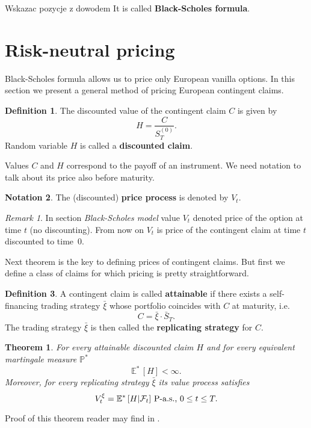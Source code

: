 \documentclass[a4paper,12pt, oneside]{book}
\newtheorem{thm}{Theorem}[section]
\theoremstyle{definition}
\newtheorem{mydef}{Definition}[section]
\newtheorem{notation}[mydef]{Notation}
\theoremstyle{remark}
\newtheorem{remark}{Remark}
\def\Em{{\mathbb{E}^*}\,}
\def\Pm{{\mathbb{P}}^*\,}
\def\Sa{\bar{S}}
\def\xia{\bar{\xi}}
\begin{document}
{\Large \color{red} Wskazac pozycje z dowodem}
It is called \textbf{Black-Scholes formula}.

\section{Risk-neutral pricing}
\label{sec:risk-neutral}
Black-Scholes formula allows us to price only European vanilla options. In this section we present a general method of pricing European contingent claims. 
\begin{mydef}
 The discounted value of the contingent claim $C$ is given by
 \begin{equation*}
  H = \frac{C}{S^{(0)}_T}.
 \end{equation*}
 Random variable $H$ is called a \textbf{discounted claim}.
\end{mydef}

Values $C$ and $H$ correspond to the payoff of an instrument. We need notation to talk about its price also before maturity.
\begin{notation}
 The (discounted) \textbf{price process} is denoted by $V_t$. 
\end{notation}
\begin{remark}
 In section \textit{Black-Scholes model} value $V_t$ denoted price of the option at time $t$ (no discounting). From now on $V_t$ is price of the contingent claim at time $t$ discounted to time~$0$.
\end{remark}

Next theorem is the key to defining prices of contingent claims. But first we define a class of claims for which pricing is pretty straightforward. 
\begin{mydef}
 A contingent claim is called \textbf{attainable} if there exists a self-financing trading strategy $\xia$ whose portfolio coincides with $C$ at maturity, i.e.
 \[ C = \xia \cdot \Sa_T. \]
 The trading strategy $\xia$ is then called the \textbf{replicating strategy} for $C$.
\end{mydef}

\begin{thm}
 For every attainable discounted claim $H$ and for every equivalent martingale measure $\Pm$
 \[ \Em [H] < \infty. \]
 Moreover, for every replicating strategy $\xia$ its value process satisfies
 \begin{equation}
  V^\xi_t = \Em[H | \mathcal{F}_t] \hbox{ P-a.s., } 0 \leq t \leq T .
 \end{equation}
\end{thm}
Proof of this theorem reader may find in \cite{follmer}.
\end{document}
